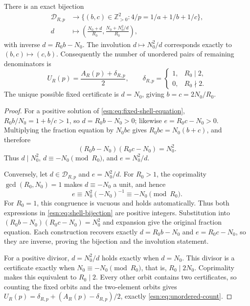 \begin{theorem}
\label{esn:thm:shell-bijection}
There is an exact bijection
\begin{equation}
 \begin{split}
 \mathcal D_{R,p}&\longrightarrow
  \{(b,c)\in\mathbb Z_{>0}^2:
                    4/p=1/a+1/b+1/c\},\\
 d&\longmapsto
 \left(\frac{N_0+d}{R_0},
       \frac{N_0+N_0^2/d}{R_0}\right),
 \end{split}
 \label{esn:eq:shell-bijection}
\end{equation}
with inverse \(d=R_0b-N_0\).  The involution \(d\mapsto N_0^2/d\)
corresponds exactly to \((b,c)\mapsto(c,b)\).  Consequently the
number of unordered pairs of remaining denominators is
\begin{equation}
 U_R(p)=\frac{A_R(p)+\delta_{R,p}}2,
 \qquad
 \delta_{R,p}=\begin{cases}1,&R_0\mid2,\\0,&R_0\nmid2.\end{cases}
 \label{esn:eq:unordered-count}
\end{equation}
The unique possible fixed certificate is \(d=N_0\), giving
\(b=c=2N_0/R_0\).
\end{theorem}

\begin{proof}
For a positive solution of \eqref{esn:eq:fixed-shell-equation},
\(R_0b/N_0=1+b/c>1\), so \(d=R_0b-N_0>0\); likewise
\(e=R_0c-N_0>0\).  Multiplying the fraction equation by
\(N_0bc\) gives \(R_0bc=N_0(b+c)\), and therefore
\[
 (R_0b-N_0)(R_0c-N_0)=N_0^2.
\]
Thus \(d\mid N_0^2\), \(d\equiv-N_0\pmod {R_0}\), and
\(e=N_0^2/d\).

Conversely, let \(d\in\mathcal D_{R,p}\) and \(e=N_0^2/d\).
For \(R_0>1\), the coprimality \(\gcd(R_0,N_0)=1\) makes
\(d\equiv-N_0\) a unit, and hence
\[
 e\equiv N_0^2(-N_0)^{-1}\equiv-N_0\pmod {R_0}.
\]
For \(R_0=1\), this congruence is vacuous and holds automatically.
Thus both expressions in \eqref{esn:eq:shell-bijection} are positive
integers.  Substitution into \((R_0b-N_0)(R_0c-N_0)=N_0^2\)
and expansion give the original fraction equation.  Each construction
recovers exactly \(d=R_0b-N_0\) and \(e=R_0c-N_0\), so they
are inverse, proving the bijection and the involution statement.

For a positive divisor, \(d=N_0^2/d\) holds exactly when
\(d=N_0\).  This divisor is a certificate exactly when
\(N_0\equiv-N_0\pmod {R_0}\), that is, \(R_0\mid2N_0\).
Coprimality makes this equivalent to \(R_0\mid2\).
Every other orbit contains two certificates, so counting the fixed
orbits and the two-element orbits gives
\(U_R(p)=\delta_{R,p}+(A_R(p)-\delta_{R,p})/2\), exactly
\eqref{esn:eq:unordered-count}.
\end{proof}

